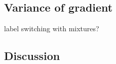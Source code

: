 \documentclass[10pt]{article}
\begin{document}
\subsection{Variance of gradient}

\todo

label switching with mixtures?


\subsection{Discussion}


\newpage




\end{document}
